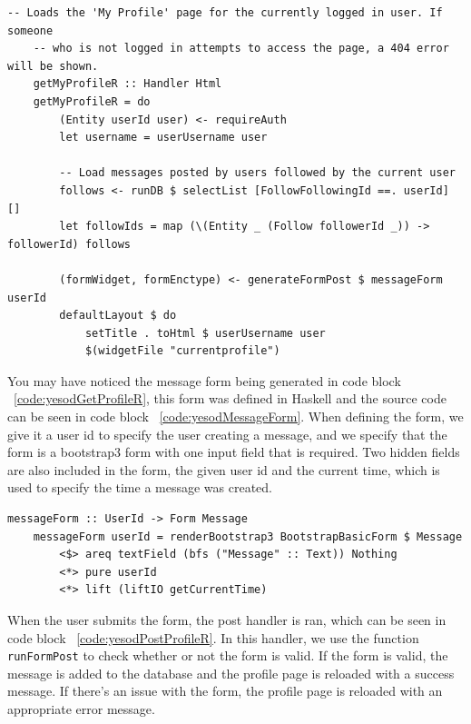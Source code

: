 \begin{lstlisting}[caption={GET request handler for current profile page},label={code:yesodGetProfileR}]
    -- Loads the 'My Profile' page for the currently logged in user. If someone
    -- who is not logged in attempts to access the page, a 404 error will be shown.
    getMyProfileR :: Handler Html
    getMyProfileR = do
        (Entity userId user) <- requireAuth
        let username = userUsername user
    
        -- Load messages posted by users followed by the current user
        follows <- runDB $ selectList [FollowFollowingId ==. userId] []
        let followIds = map (\(Entity _ (Follow followerId _)) -> followerId) follows
    
        (formWidget, formEnctype) <- generateFormPost $ messageForm userId
        defaultLayout $ do
            setTitle . toHtml $ userUsername user
            $(widgetFile "currentprofile")
\end{lstlisting}

You may have noticed the message form being generated in code block ~\ref{code:yesodGetProfileR},
this form was defined in Haskell and the source code can be seen in code block ~\ref{code:yesodMessageForm}.
When defining the form, we give it a user id to specify the user creating a message, and
we specify that the form is a bootstrap3 form with one input field that is required. Two
hidden fields are also included in the form, the given user id and the current time, which
is used to specify the time a message was created.

\begin{lstlisting}[caption={The message form},label={code:yesodMessageForm}]
    messageForm :: UserId -> Form Message
    messageForm userId = renderBootstrap3 BootstrapBasicForm $ Message
        <$> areq textField (bfs ("Message" :: Text)) Nothing
        <*> pure userId
        <*> lift (liftIO getCurrentTime)
\end{lstlisting}

When the user submits the form, the post handler is ran, which can be seen in code block
~\ref{code:yesodPostProfileR}. In this handler, we use the function \texttt{runFormPost}
to check whether or not the form is valid. If the form is valid, the message is added
to the database and the profile page is reloaded with a success message. If there's an
issue with the form, the profile page is reloaded with an appropriate error message.

